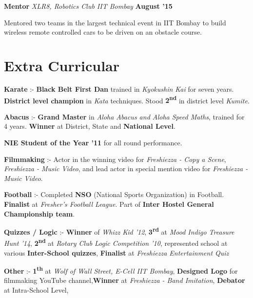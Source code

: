 \documentclass[11pt]{resume}
\begin{document}
\begin{resume}
\textbf{Mentor} \textit{XLR8, Robotics Club IIT Bombay} \hfill \textbf{August '15}

\begin{list2}
\item Mentored two teams in the largest technical event in IIT Bombay to build wireless remote controlled cars to be driven on an obstacle course.
\end{list2}
\vspace{-2.5mm}
\pagebreak
\section{\mysidestyle Extra Curricular}
\begin{list2}
\item \textbf {Karate} :- \textbf{Black Belt First Dan} trained in \textsl{Kyokushin Kai} for seven years. \textbf{District level champion} in \textsl{Kata} techniques. Stood \textbf {2\textsuperscript{nd}} in district level \textsl{Kumite}.

\item \textbf {Abacus} :- \textbf{Grand Master} in \textsl{Aloha Abacus and Aloha Speed Maths}, trained for 4 years. \textbf{Winner} at District, State and \textbf{National Level}. 

\item \textbf {NIE Student of the Year '11} for all round performance. 

\item \textbf {Filmmaking} :- Actor in the winning video for \textsl{Freshiezza - Copy a Scene}, \textsl{Freshiezza - Music Video}, and lead actor in special mention video for \textsl{Freshiezza - Music Video}.

\item \textbf {Football} :- Completed \textbf{NSO} (National Sports Organization) in Football. \textbf{Finalist} at \textsl{Fresher's Football League}. Part of \textbf{Inter Hostel General Championship team}.

\item \textbf {Quizzes / Logic} :- \textbf{Winner} of \textsl{Whizz Kid '12}, \textbf{3\textsuperscript{rd}} at \textsl{Mood Indigo Treasure Hunt '14}, \textbf{2\textsuperscript{nd}} at \textsl{Rotary Club Logic Competition '10}, represented school at various \textbf{Inter-School quizzes}, \textbf{Finalist} at \textsl{Freshiezza Entertainment Quiz}

\item \textbf {Other} :- \textbf{1\textsuperscript{th}} at \textsl {Wolf of Wall Street, E-Cell IIT Bombay}, \textbf{Designed Logo} for filmmaking YouTube channel,\textbf{Winner} at \textsl{Freshiezza - Band Imitation},  \textbf{Debator} at Intra-School Level, 


\end{list2}
\end{resume}
\end{document}
